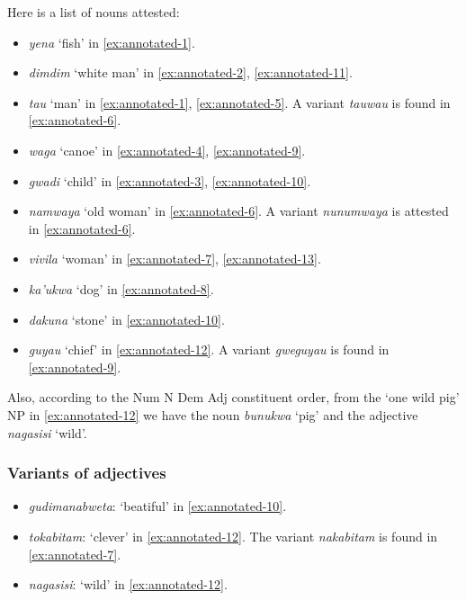 \documentclass{article}
\newcommand*{\corpus}[1]{\emph{#1}}
\newcommand{\translate}[1]{`#1'}
\begin{document}
Here is a list of nouns attested:
\begin{itemize}
    \item \corpus{yena} \translate{fish} in \eqref{ex:annotated-1}.
    \item \corpus{dimdim} \translate{white man} in \eqref{ex:annotated-2}, \eqref{ex:annotated-11}.
    \item \corpus{tau} \translate{man} in \eqref{ex:annotated-1}, \eqref{ex:annotated-5}.
    A variant \corpus{tauwau} is found in \eqref{ex:annotated-6}.
    \item \corpus{waga} \translate{canoe} in \eqref{ex:annotated-4}, \eqref{ex:annotated-9}.
    \item \corpus{gwadi} \translate{child} in \eqref{ex:annotated-3}, \eqref{ex:annotated-10}.
    \item \corpus{namwaya} \translate{old woman} in \eqref{ex:annotated-6}.
    A variant \corpus{nunumwaya} is attested in \eqref{ex:annotated-6}.
    \item \corpus{vivila} \translate{woman} in \eqref{ex:annotated-7}, \eqref{ex:annotated-13}.
    \item \corpus{ka'ukwa} \translate{dog} in \eqref{ex:annotated-8}.
    \item \corpus{dakuna} \translate{stone} in \eqref{ex:annotated-10}. 
    \item \corpus{guyau} \translate{chief} in \eqref{ex:annotated-12}.
    A variant \corpus{gweguyau} is found in \eqref{ex:annotated-9}.
\end{itemize}

Also, according to the Num N Dem Adj constituent order,
from the \translate{one wild pig} NP in \eqref{ex:annotated-12}
we have the noun \corpus{bunukwa} \translate{pig} 
and the adjective \corpus{nagasisi} \translate{wild}.

\subsubsection{Variants of adjectives}\label{sec:adjectives-observe}

\begin{itemize}
    \item \corpus{gudimanabweta}: \translate{beatiful} in \eqref{ex:annotated-10}.
    \item \corpus{tokabitam}: \translate{clever} in \eqref{ex:annotated-12}.
    The variant \corpus{nakabitam} is found in \eqref{ex:annotated-7}.
    \item \corpus{nagasisi}: \translate{wild} in \eqref{ex:annotated-12}.
\end{itemize}
\end{document}
